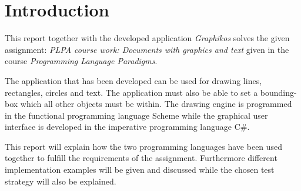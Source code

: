 \chapter{Introduction}
\label{chp:intro}

This report together with the developed application \emph{Graphikos} solves the given assignment: \emph{PLPA course work: Documents with graphics and text} given in the course \emph{Programming Language Paradigms}.

The application that has been developed can be used for drawing lines, rectangles, circles and text. The application must also be able to set a bounding-box which all other objects must be within. The drawing engine is programmed in the functional programming language Scheme while the graphical user interface is developed in the imperative programming language C\#. 

This report will explain how the two programming languages have been used together to fulfill the requirements of the assignment. Furthermore different implementation examples will be given and discussed while the chosen test strategy will also be explained.

